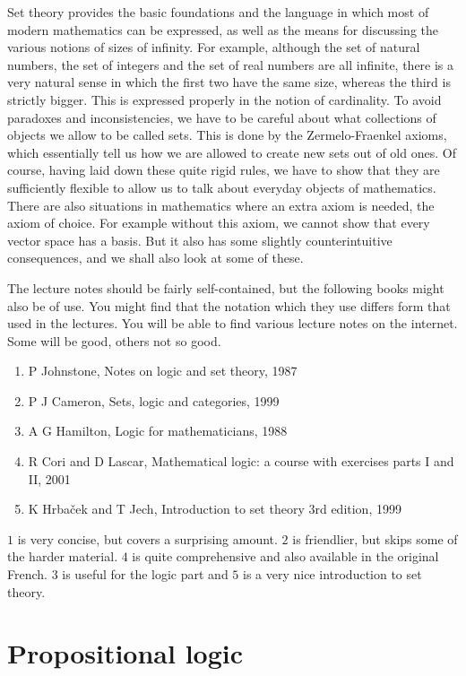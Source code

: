 \documentclass{article}
\theoremstyle{definition}\newtheorem{definition}{Definition}[subsection]
\theoremstyle{definition}\newtheorem{remark}[definition]{Remark}
\theoremstyle{definition}\newtheorem*{example}{Example}
\theoremstyle{definition}\newtheorem*{note}{Note}
\begin{document}
Set theory provides the basic foundations and the language in which most of modern mathematics can be expressed, as well as the means for discussing the various notions of sizes of infinity. For example, although the set of natural numbers, the set of integers and the set of real numbers are all infinite, there is a very natural sense in which the first two have the same size, whereas the third is strictly bigger. This is expressed properly in the notion of cardinality. To avoid paradoxes and inconsistencies, we have to be careful about what collections of objects we allow to be called sets. This is done by the Zermelo-Fraenkel axioms, which essentially tell us how we are allowed to create new sets out of old ones. Of course, having laid down these quite rigid rules, we have to show that they are sufficiently flexible to allow us to talk about everyday objects of mathematics. There are also situations in mathematics where an extra axiom is needed, the axiom of choice. For example without this axiom, we cannot show that every vector space has a basis. But it also has some slightly counterintuitive consequences, and we shall also look at some of these.

The lecture notes should be fairly self-contained, but the following books might also be of use. You might find that the notation which they use differs form that used in the lectures. You will be able to find various lecture notes on the internet. Some will be good, others not so good.

\begin{enumerate}
\item P Johnstone, Notes on logic and set theory, 1987
\item P J Cameron, Sets, logic and categories, 1999
\item A G Hamilton, Logic for mathematicians, 1988
\item R Cori and D Lascar, Mathematical logic: a course with exercises parts I and II, 2001
\item K Hrbaček and T Jech, Introduction to set theory 3rd edition, 1999
\end{enumerate}

$ 1 $ is very concise, but covers a surprising amount. $ 2 $ is friendlier, but skips some of the harder material. $ 4 $ is quite comprehensive and also available in the original French. $ 3 $ is useful for the logic part and $ 5 $ is a very nice introduction to set theory.

\section{Propositional logic}
\end{document}
